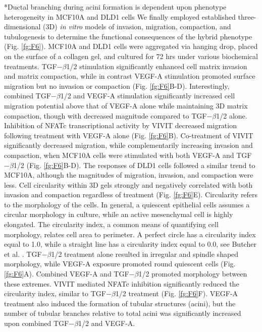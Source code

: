 \documentclass[12pt]{article}
\makeatletter
\renewcommand\subsection{\@startsection
	{subsection}{2}{0mm}
	{-0.05in}
	{-0.5\baselineskip}
	{\normalfont\normalsize\bfseries}}
\makeatother
\begin{document}
\subsection*{Ductal branching during acini formation is dependent upon phenotype heterogeneity in MCF10A and DLD1 cells}
We finally employed established three-dimensional (3D) \emph{in vitro} models of invasion, migration, compaction, and tubulogenesis \citep{Dhimolea2010}
to determine the functional consequences of the hybrid phenotype (Fig. \ref{fg:F6}).
MCF10A and DLD1 cells were aggregated via hanging drop, placed on the surface of a collagen gel, and cultured for 72 hrs under various biochemical treatments.
TGF$-\beta$1/2 stimulation significantly enhanced cell matrix invasion and matrix compaction, while in contrast VEGF-A stimulation promoted surface migration but no invasion or compaction (Fig. \ref{fg:F6}B-D).
Interestingly, combined TGF$-\beta$1/2 and VEGF-A stimulation significantly increased cell migration potential above that of VEGF-A alone while maintaining 3D matrix compaction, though with decreased magnitude compared to TGF$-\beta$1/2 alone.
Inhibition of NFATc transcriptional activity by VIVIT decreased migration following treatment with VEGF-A alone (Fig. \ref{fg:F6}B).
Co-treatment of VIVIT significantly decreased migration, while complementarily increasing invasion and compaction, when MCF10A cells were stimulated with both VEGF-A and TGF$-\beta$1/2 (Fig. \ref{fg:F6}B-D).
The responses of DLD1 cells followed a similar trend to MCF10A, although the magnitudes of migration, invasion, and compaction were less.
Cell circularity within 3D gels strongly and negatively correlated with both invasion and compaction regardless of treatment (Fig. \ref{fg:F6}E).
Circularity refers to the morphology of the cells. In general, a quiescent epithelial cells assumes a circular morphology in culture, while an active mesenchymal cell is highly elongated.
The circularity index, a common means of quantifying cell morphology, relates cell area to perimeter.
A perfect circle has a circularity index equal to 1.0, while a straight line has a circularity index equal to 0.0, see Butcher et al. \citep{Butcher:2004aa}.
TGF$-\beta$1/2 treatment alone resulted in irregular and spindle shaped morphology, while VEGF-A exposure promoted round quiescent cells (Fig. \ref{fg:F6}A).
Combined VEGF-A and TGF$-\beta$1/2 promoted morphology between these extremes.
VIVIT mediated NFATc inhibition significantly reduced the circularity index, similar to TGF$-\beta$1/2 treatment (Fig. \ref{fg:F6}F).
VEGF-A treatment also induced the formation of tubular structures (acini), but the number of tubular branches relative to total acini was significantly increased upon combined TGF$-\beta$1/2 and VEGF-A.
\end{document}
